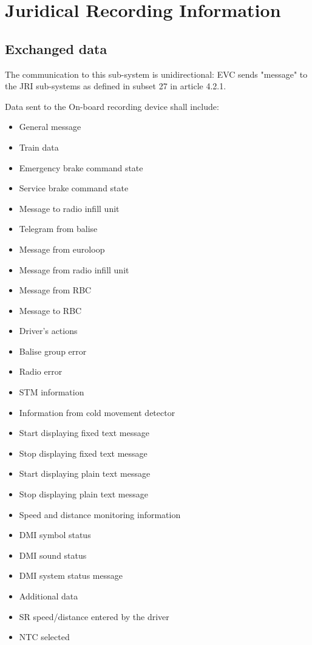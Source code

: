 \documentclass{template/openetcs_article}
\begin{document}
\section{Juridical Recording Information}
	\subsection{Exchanged data}
		The communication to this sub-system is unidirectional: EVC sends "message" to the JRI sub-systems as defined in subset 27 in article 4.2.1.
		
		Data sent to the On-board recording device shall include:
		\begin{itemize}
			\item General message
			\item Train data 
			\item Emergency brake command state
			\item Service brake command state
			\item Message to radio infill unit
			\item Telegram from balise
			\item Message from euroloop 
			\item Message from radio infill unit
			\item Message from RBC
			\item Message to RBC
			\item Driver’s actions
			\item Balise group error
			\item Radio error
			\item STM information
			\item Information from cold movement detector
			\item Start displaying fixed text message 
			\item Stop displaying fixed text message 
			\item Start displaying plain text message 
			\item Stop displaying plain text message 
			\item Speed and distance monitoring information 
			\item DMI symbol status
			\item DMI sound status
			\item DMI system status message
			\item Additional data
			\item SR speed/distance entered by the driver
			\item NTC selected

\end{itemize}
\end{document}
